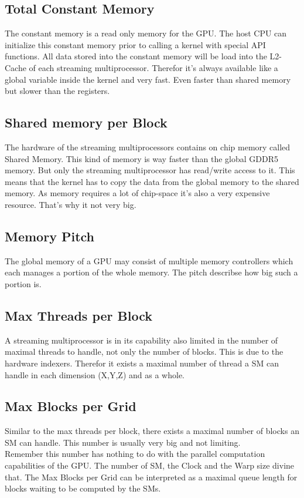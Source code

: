 \subsection{Total Constant Memory}
The constant memory is a read only memory for the GPU. The host CPU can initialize this constant memory prior to calling a kernel with special API functions. All data stored into the constant memory will be load into the L2-Cache of each streaming multiprocessor. Therefor it's always available like a global variable inside the kernel and very fast. Even faster than shared memory but slower than the registers.

\subsection{Shared memory per Block}
The hardware of the streaming multiprocessors contains on chip memory called Shared Memory. This kind of memory is way faster than the global GDDR5 memory. But only the streaming multiprocessor has read/write access to it. This means that the kernel has to copy the data from the global memory to the shared memory. As memory requires a lot of chip-space it's also a very expensive resource. That's why it not very big.\\

\subsection{Memory Pitch}
The global memory of a GPU may consist of multiple memory controllers which each manages a portion of the whole memory. The pitch describse how big such a portion is.

\subsection{Max Threads per Block}
A streaming multiprocessor is in its capability also limited in the number of maximal threads to handle, not only the number of blocks. This is due to the hardware indexers. Therefor it exists a maximal number of thread a SM can handle in each dimension (X,Y,Z) and as a whole.

\subsection{Max Blocks per Grid}
Similar to the max threads per block, there exists a maximal number of blocks an SM can handle. This number is usually very big and not limiting. \\
Remember this number has nothing to do with the parallel computation capabilities of the GPU. The number of SM, the Clock and the Warp size divine that. The Max Blocks per Grid can be interpreted as a maximal queue length for blocks waiting to be computed by the SMs.


